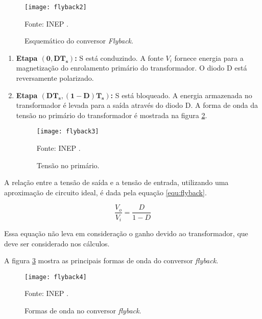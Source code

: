    \begin{figure}[H]
      \centering
      \caption{Esquemático do conversor \textit{Flyback}.}
      \texttt{[image: flyback2]}
      \label{fig:flyback2}
      
      \small Fonte: INEP \cite{INEP}.
    \end{figure}
    
    \begin{enumerate}
      \item \textbf{Etapa $\mathbf{(0, DT_s)}$:}  S está conduzindo. A fonte $V_i$ fornece energia para a magnetização do enrolamento primário do transformador. O diodo D está reversamente polarizado.
      
      \item \textbf{Etapa $\mathbf{(DT_s, (1-D)T_s)}$:}  S está bloqueado. A energia armazenada no transformador é levada para a saída através do diodo D. A forma de onda da tensão no primário do transformador é mostrada na figura \ref{fig:flyback3}.
      
      \begin{figure}[H]
        \centering
        \caption{Tensão no primário.}
        \texttt{[image: flyback3]}
        \label{fig:flyback3}
        
        \small Fonte: INEP \cite{INEP}.
      \end{figure}
    \end{enumerate}
    
    A relação entre a tensão de saída e a tensão de entrada, utilizando uma aproximação de circuito ideal, é dada pela equação \ref{equ:flyback}.
    
    \begin{equation}
    \label{equ:flyback}
    \frac{V_o}{V_i} = \frac{D}{1-D}
    \end{equation}
    
    Essa equação não leva em consideração o ganho devido ao transformador, que deve ser considerado nos cálculos.
    
    A figura \ref{fig:flyback4} mostra as principais formas de onda do conversor \textit{flyback}.

    \begin{figure}[H]
      \centering
      \caption{Formas de onda no conversor \textit{flyback}.}
      \texttt{[image: flyback4]}
      \label{fig:flyback4}
      
      \small Fonte: INEP \cite{INEP}.
    \end{figure}